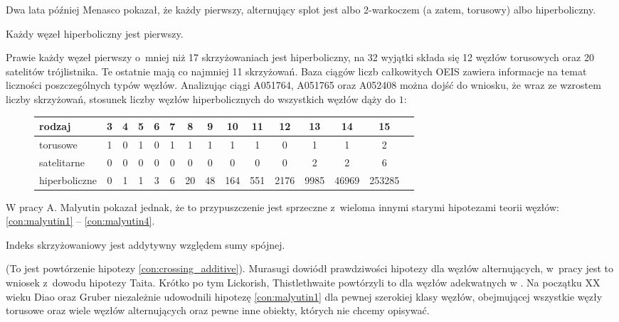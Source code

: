 Dwa lata później Menasco \cite{menasco84} pokazał, że każdy pierwszy, alternujący splot jest albo 2-warkoczem (a zatem, torusowy) albo hiperboliczny.

\begin{corollary}
    Każdy węzeł hiperboliczny jest pierwszy.
\end{corollary}

Prawie każdy węzeł pierwszy o~mniej niż 17 skrzyżowaniach jest hiperboliczny, na 32 wyjątki składa się 12 węzłów torusowych oraz 20 satelitów trójlistnika.
Te ostatnie mają co najmniej 11 skrzyżowań.
Baza ciągów liczb całkowitych OEIS zawiera informacje na temat liczności poszczególnych typów węzłów.
Analizując ciągi A051764, A051765 oraz A052408 można dojść do wniosku, że wraz ze wzrostem liczby skrzyżowań, stosunek liczby węzłów hiperbolicznych do wszystkich węzłów dąży do $1$:

\begin{figure}[H]
\renewcommand*{\arraystretch}{1.4}
\footnotesize
\begin{longtable}{lcccccccccccccc}
\hline
    \textbf{rodzaj} & 3 & 4 & 5 & 6 & 7 & 8  & 9  & 10  & 11  & 12   & 13   & 14    & 15     \\ \hline \endhead
    torusowe        & 1 & 0 & 1 & 0 & 1 & 1  & 1  & 1   & 1   & 0    & 1    & 1     & 2      \\
    satelitarne     & 0 & 0 & 0 & 0 & 0 & 0  & 0  & 0   & 0   & 0    & 2    & 2     & 6      \\
    hiperboliczne   & 0 & 1 & 1 & 3 & 6 & 20 & 48 & 164 & 551 & 2176 & 9985 & 46969 & 253285 \\
    \hline
\end{longtable}
\normalsize
\end{figure}

W pracy \cite{malyutin16} A. Malyutin pokazał jednak, że to przypuszczenie jest sprzeczne z~wieloma innymi starymi hipotezami teorii węzłów: \ref{con:malyutin1} -- \ref{con:malyutin4}.

\begin{conjecture}
    \label{con:malyutin1}
    Indeks skrzyżowaniowy jest addytywny względem sumy spójnej.
\end{conjecture}

(To jest powtórzenie hipotezy \ref{con:crossing_additive}).
Murasugi dowiódł prawdziwości hipotezy dla węzłów alternujących, w~pracy \cite{murasugi87} jest to wniosek z~dowodu hipotezy Taita.
Krótko po tym Lickorish, Thistlethwaite powtórzyli to dla węzłów adekwatnych w \cite{lickorish88}.
Na początku XX wieku Diao \cite{diao04} oraz Gruber \cite{gruber03} niezależnie udowodnili hipotezę \ref{con:malyutin1} dla pewnej szerokiej klasy węzłów, obejmującej wszystkie węzły torusowe oraz wiele węzłów alternujących oraz pewne inne obiekty, których nie chcemy opisywać.

